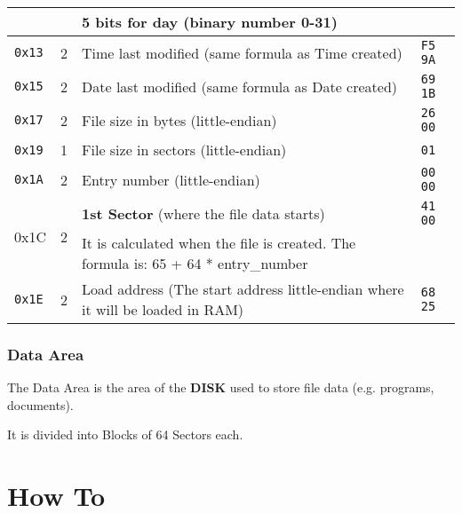 \documentclass[a4paper,11pt]{article}
\begin{document}
\begin{longtable}{ |m{1cm}|m{1.3cm}|m{6.8cm}|m{2.7cm}| }
            & & 5 bits for day (binary number 0-31) &\\
            \hline
            \texttt{0x13} & 2 & Time last modified (same formula as Time created) 
            & \texttt{F5 9A}\\
            \hline
            \texttt{0x15} & 2 & Date last modified (same formula as Date created)
            & \texttt{69 1B}\\
            \hline
            \texttt{0x17} & 2 & File size in bytes (little-endian) & \texttt{26 00}\\
            \hline
            \texttt{0x19} & 1 & File size in sectors (little-endian) & \texttt{01}\\
            \hline
            \texttt{0x1A} & 2 & Entry number (little-endian) & \texttt{00 00}\\
            \hline
            \multirow{2}{4em}{0x1C} & \multirow{2}{4em}{2} & \textbf{1st Sector}
            (where the file data starts) & \texttt{41 00}\\
            & & It is calculated when the file is created. The formula is: 65 + 
            64 * entry\_number &\\
            \hline
            \texttt{0x1E} & 2 & Load address (The start address little-endian
            where it  will be loaded in RAM) & \texttt{68 25}\\
            \hline
        \end{longtable}

        \subsubsection{Data Area}
        The Data Area is the area of the \textbf{DISK} used to store file data 
        (e.g. programs, documents).
        
        It is divided into Blocks of 64 Sectors each.

    \pagebreak
    \section{How To}

\end{document}

